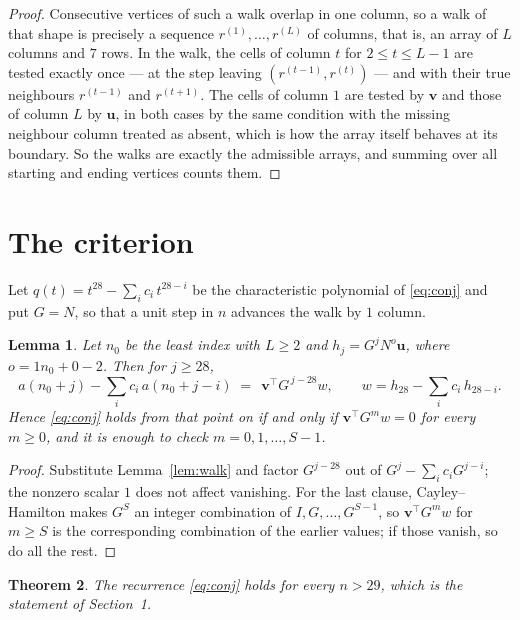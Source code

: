 \documentclass[11pt,a4paper]{article}
\theoremstyle{plain}
\newtheorem{theorem}{Theorem}
\newtheorem{lemma}[theorem]{Lemma}
\theoremstyle{definition}
\begin{document}
\begin{proof}
Consecutive vertices of such a walk overlap in one column, so a walk of that shape is
precisely a sequence $r^{(1)},\dots,r^{(L)}$ of columns, that is, an array of $L$ columns
and $7$ rows. In the walk, the cells of column $t$ for $2\le t\le L-1$ are tested
exactly once --- at the step leaving $(r^{(t-1)},r^{(t)})$ --- and with their true
neighbours $r^{(t-1)}$ and $r^{(t+1)}$. The cells of column $1$ are tested by
$\mathbf{v}$ and those of column $L$ by $\mathbf{u}$, in both cases by the same condition
with the missing neighbour column treated as absent, which is how the array itself behaves at
its boundary. So the walks are exactly the admissible arrays, and summing over all starting
and ending vertices counts them.
\end{proof}

\section{The criterion}

Let $q(t)=t^{28}-\sum_i c_i\,t^{28-i}$ be the characteristic polynomial of
\eqref{eq:conj} and put $G=N$, so that a unit step in $n$ advances the walk by
$1$ column.

\begin{lemma}\label{lem:crit}
Let $n_0$ be the least index with $L\ge2$ and $h_j=G^{j}N^{o}\mathbf{u}$, where
$o=1n_0+0-2$. Then for $j\ge28$,
\[
a(n_0+j)-\sum_i c_i\,a(n_0+j-i)\;=\;\,\mathbf{v}^{\!\top}G^{\,j-28}w,
\qquad w=h_{28}-\sum_i c_i\,h_{28-i} .
\]
Hence \eqref{eq:conj} holds from that point on if and only if
$\mathbf{v}^{\!\top}G^{m}w=0$ for every $m\ge0$, and it is enough to check
$m=0,1,\dots,S-1$.
\end{lemma}

\begin{proof}
Substitute Lemma~\ref{lem:walk} and factor $G^{j-28}$ out of
$G^{j}-\sum_ic_iG^{j-i}$; the nonzero scalar $1$ does not affect
vanishing. For the last clause, Cayley--Hamilton makes $G^{S}$ an integer combination of
$I,G,\dots,G^{S-1}$, so $\mathbf{v}^{\!\top}G^{m}w$ for $m\ge S$ is the corresponding
combination of the earlier values; if those vanish, so do all the rest.
\end{proof}

\begin{theorem}
The recurrence \eqref{eq:conj} holds for every $n>29$, which is the statement of
Section~1.
\end{theorem}
\end{document}
